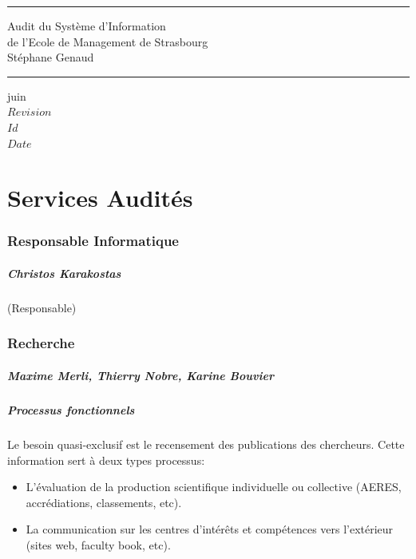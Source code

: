 \documentclass{book}
\begin{document}
\newcommand{\motcle}[1]{\index{#1}\emph{#1}}
\newcommand{\instrcle}[1]{\index{\texttt{#1}}\texttt{#1}}

\thispagestyle{empty}
\rhead[]{}
\pagestyle{fancy}
\setlength{\parindent}{0mm}
\setlength{\parskip}{0mm}
\rule{\linewidth}{1mm}
\begin{center}
\Large{Audit du Système d'Information}\\[5mm]
\Large{de l'Ecole de Management de Strasbourg}\\[5mm]
\large{Stéphane Genaud}
\rule{\linewidth}{1mm}
\end{center}
\begin{center}
juin  \\
\textrm{
$Revision$\\
$Id$\\
$Date$\\
}
\end{center}

\tableofcontents
\newpage

 
 

\chapter{Services Audités}
 

\subsection{Responsable Informatique}

\paragraph{Christos Karakostas} (Responsable)


\subsection{Recherche}
\paragraph{Maxime Merli, Thierry Nobre, Karine Bouvier}

\paragraph{Processus fonctionnels}
Le besoin quasi-exclusif est le recensement des publications des chercheurs.
Cette information sert à deux types processus:
\begin{itemize}
\item L'évaluation de la production scientifique individuelle ou 
collective (AERES, accrédiations, classements, etc).
\item La communication sur les centres d'intérêts et compétences 
vers l'extérieur (sites web, faculty book, etc).
\end{itemize}
\end{document}
